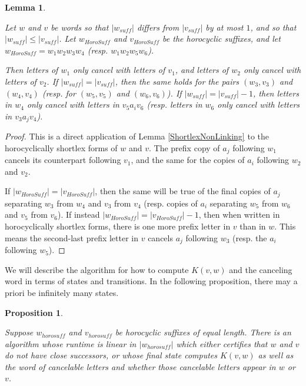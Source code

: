 \documentclass{amsart}
\newtheorem{lemma}[theorem]{Lemma}
\newtheorem{proposition}[theorem]{Proposition}
\theoremstyle{definition}
\theoremstyle{remark}
\begin{document}
	
	\begin{lemma} \label{MatchedCancellation}
		
		Let $w$ and $v$ be words so that $|w_{suff}|$ differs from $|v_{suff}|$ by at most $1$, and so that $|w_{suff}|\le |v_{suff}|$. Let $w_{HoroSuff}$ and $v_{HoroSuff}$ be the horocyclic suffixes, and let \newline $w_{HoroSuff}=w_1w_2w_3w_4$ (resp. $w_1w_2w_5w_6$).
		
		Then letters of $w_1$ only cancel with letters of $v_1$, and letters of $w_2$ only cancel with letters of $v_2$. If $|w_{suff}|=|v_{suff}|$, then the same holds for the pairs $(w_3, v_3)$ and $(w_4, v_4)$ (resp. for $(w_5, v_5)$ and $(w_6, v_6)$). If $|w_{suff}|=|v_{suff}|-1$, then letters in $w_4$ only cancel with letters in $v_5a_iv_6$ (resp. letters in $w_6$ only cancel with letters in $v_3a_jv_4$).
		
	\end{lemma}
	
	\begin{proof}
		
		This is a direct application of Lemma \ref{ShortlexNonLinking} to the horocyclically shortlex forms of $w$ and $v$. The prefix copy of $a_j$ following $w_1$ cancels its counterpart following $v_1$, and the same for the copies of $a_i$ following $w_2$ and $v_2$. 
		
		If $|w_{HoroSuff}|=|v_{HoroSuff}|$, then the same will be true of the final copies of $a_j$ separating $w_3$ from $w_4$ and $v_3$ from $v_4$ (resp. copies of $a_i$ separating $w_5$ from $w_6$ and $v_5$ from $v_6$). If instead $|w_{HoroSuff}|=|v_{HoroSuff}|-1$, then when written in horocyclically shortlex forms, there is one more prefix letter in $v$ than in $w$. This means the second-last prefix letter in $v$ cancels $a_j$ following $w_3$ (resp. the $a_i$ following $w_5$).
	\end{proof}
	
	We will describe the algorithm for how to compute $K(v,w)$ and the canceling word in terms of states and transitions. In the following proposition, there may a priori be infinitely many states.
	
	\begin{proposition}\label{DivergenceGraphEdgeAlgorithm}
		
		Suppose $w_{horosuff}$ and $v_{horosuff}$ be horocyclic suffixes of equal length. There is an algorithm whose runtime is linear in $|w_{horosuff}|$ which either certifies that $w$ and $v$ do not have close successors, or whose final state computes $K(v,w)$ as well as the word of cancelable letters and whether those cancelable letters appear in $w$ or $v$.
		
	\end{proposition}
	
\end{document}
